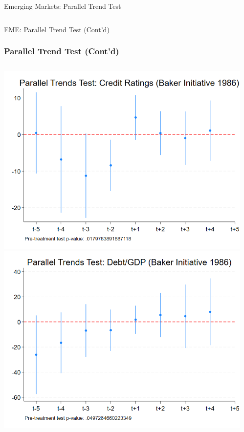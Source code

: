 \documentclass{beamer}
\begin{document}
\begin{frame}{Emerging Markets: Parallel Trend Test}
\begin{columns}
\begin{column}{0.5\textwidth}
    \end{column}
  \end{columns}
\end{frame}

\begin{frame}{EME: Parallel Trend Test (Cont'd)}
  \frametitle{Parallel Trend Test (Cont'd)}
  \begin{columns}[T] %
    \begin{column}{0.45\textwidth}
      \centering
      \includegraphics[width=0.9\linewidth]{figures/PT_Baker_Ratings.png}
      \includegraphics[width=0.9\linewidth]{figures/PT_Baker_Debt.png}
    \end{column}
    \begin{column}{0.45\textwidth}
      \centering

\end{column}
\end{columns}
\end{frame}
\end{document}
